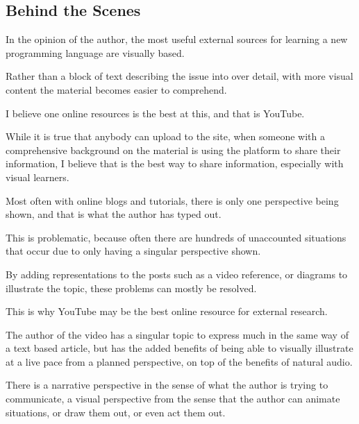 \documentclass{article}
\begin{document}
\medskip\medskip
\begin{lstlisting}
\end{lstlisting}

\medskip

\subsection{Behind the Scenes}
\medskip\medskip
\hspace{\parindent} 

In the opinion of the author, the most useful external sources for learning a new programming language are visually based. 

\medskip\noindent
Rather than a block of text describing the issue into over detail, with more visual content the material becomes easier to comprehend.  

\medskip\noindent
I believe one online resources is the best at this, and that is YouTube. 

\medskip\noindent
While it is true that anybody can upload to the site, when someone with a comprehensive background on the material is using the platform to share their information, I believe that is the best way to share information, especially with visual learners. 

\medskip\noindent
Most often with online blogs and tutorials, there is only one perspective being shown, and that is what the author has typed out. 

\medskip\noindent
This is problematic, because often there are hundreds of unaccounted situations that occur due to only having a singular perspective shown. 

\medskip\noindent
By adding representations to the posts such as a video reference, or diagrams to illustrate the topic, these problems can mostly be resolved. 

\medskip\noindent
This is why YouTube may be the best online resource for external research. 

\medskip\noindent
The author of the video has a singular topic to express much in the same way of a text based article, but has the added benefits of being able to visually illustrate at a live pace from a planned perspective, on top of the benefits of natural audio. 

\medskip\noindent
There is a narrative perspective in the sense of what the author is trying to communicate, a visual perspective from the sense that the author can animate situations, or draw them out, or even act them out. 
\end{document}

